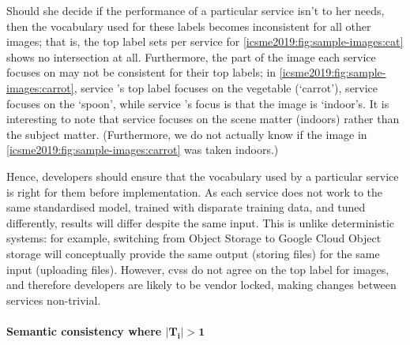 Should she decide if the performance of a particular service isn't to her needs, then the vocabulary used for these labels becomes inconsistent for all other images; that is, the top label sets per service for \cref{icsme2019:fig:sample-images:cat} shows no intersection at all. Furthermore, the part of the image each service focuses on may not be consistent for their top labels; in \cref{icsme2019:fig:sample-images:carrot}, service \googleapi{}'s top label focuses on the vegetable (`carrot'), service \awsapi{} focuses on the `spoon', while service \azureapi{}'s focus is that the image is `indoor's. It is interesting to note that service \azureapi{} focuses on the scene matter (indoors) rather than the subject matter. (Furthermore, we do not actually know if the image in \cref{icsme2019:fig:sample-images:carrot} was taken indoors.)

Hence, developers should ensure that the vocabulary used by a particular service is right for them before implementation. As each service does not work to the same standardised model, trained with disparate training data, and tuned differently, results will differ despite the same input. This is unlike deterministic systems: for example, switching from  Object Storage to Google Cloud Object storage will conceptually provide the same output (storing files) for the same input (uploading files). However, \glspl{cvs} do not agree on the top label for images, and therefore developers are likely to be vendor locked, making changes between services non-trivial.

\paragraph{Semantic consistency where $\boldsymbol{|T_{i}| > 1}$}

